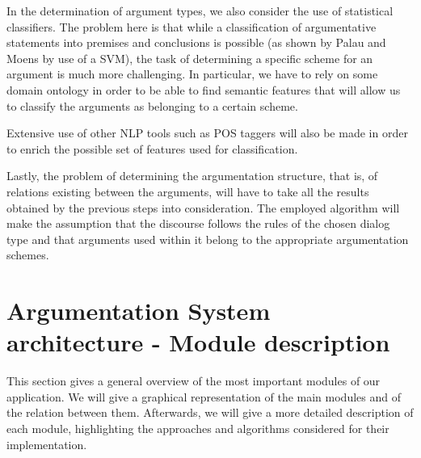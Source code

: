 \documentclass[lnbip]{svmultln}
\begin{document}
\par
In the determination of argument types, we also consider the use of statistical classifiers.
The problem here is that while a classification of argumentative statements into premises and conclusions is possible (as shown by Palau and Moens by use of a SVM), the task of determining a specific scheme for an argument is much more challenging. In particular, we have to rely on some domain ontology in order to be able to find semantic features that will allow us to classify the arguments as belonging to a certain scheme.
\par
Extensive use of other NLP tools such as POS taggers will also be made in order to enrich the possible set of features used for classification.

\par
Lastly, the problem of determining the argumentation structure, that is, of relations existing between the arguments, will have to take all the results obtained by the previous steps into consideration. The employed algorithm will make the assumption that the discourse follows the rules of the chosen dialog type and that arguments used within it belong to the appropriate argumentation schemes.

\section{Argumentation System architecture - Module description}
\par
This section gives a general overview of the most important modules of our application. We will give a graphical representation of the main modules and of the relation between them. Afterwards, we will give a more detailed description of each module, highlighting the approaches and algorithms considered for their implementation.
\end{document}
